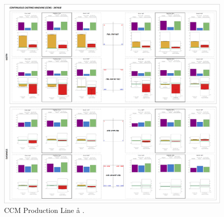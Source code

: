 \begin{landscape}
\begin{figure}[ht]
	\centering
	\includegraphics[width=1.1\textwidth]{../images/supplements-CCM_real_life_events_analysis-results.png}
	\caption{CCM Production Line \aa{} \bb{}.}
	\label{figure-supplements-CCM}
\end{figure}
\end{landscape}